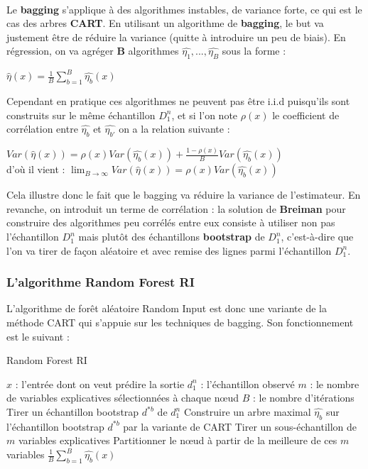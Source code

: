\documentclass[14pt, openany]{article}
\begin{document}
\paragraph{}
Le \textbf{bagging} s'applique à des algorithmes instables, de variance forte, ce qui est le cas des arbres \textbf{CART}. En utilisant un algorithme de \textbf{bagging}, le but va justement être de réduire la variance (quitte à introduire un peu de biais).
En régression, on va agréger \textbf{B} algorithmes $\hat{\eta_1},...,\hat{\eta_B}$ sous la forme :
\begin{center}
$\hat{\eta}(x)=\frac{1}{B}\sum\limits_{b=1}^B \hat{\eta_b}(x)$
\end{center}
Cependant en pratique ces algorithmes ne peuvent pas être i.i.d puisqu'ils sont construits sur le même échantillon $D^{n}_{1}$, et si l'on note $\rho(x)$ le coefficient de corrélation entre $\hat{\eta_b}$ et $\hat{\eta_{b'}}$ on a la relation suivante :
\begin{center}
$Var(\hat{\eta}(x))=\rho(x)Var(\hat{\eta_b}(x))+\frac{1-\rho(x)}{B}Var(\hat{\eta_b}(x))$\\
\medskip
d'où il vient : $\lim_{B \to \infty} Var(\hat{\eta}(x)) = \rho(x)Var(\hat{\eta_b}(x))$
\end{center}
Cela illustre donc le fait que le bagging va réduire la variance de l'estimateur. En revanche, on introduit un terme de corrélation : la solution de \textbf{Breiman} pour construire des algorithmes peu corrélés entre eux consiste à utiliser non pas l'échantillon $D^{n}_{1}$ mais plutôt des échantillons \textbf{bootstrap} de $D^{n}_{1}$, c'est-à-dire que l'on va tirer de façon aléatoire et avec remise des lignes parmi l'échantillon $D^{n}_{1}$.
\subsubsection{L'algorithme Random Forest RI}
L'algorithme de forêt aléatoire Random Input est donc une variante de la méthode CART qui s'appuie sur les techniques de bagging. Son fonctionnement est le suivant :\\
\begin{algorithm}
\caption{Random Forest RI}
\begin{algorithmic}
\REQUIRE 
\STATE $x$ : l'entrée dont on veut prédire la sortie
\STATE $d^{n}_{1}$ : l'échantillon observé
\STATE $m$ : le nombre de variables explicatives sélectionnées à chaque nœud
\STATE $B$ : le nombre d'itérations
\ENSURE
{}
\STATE Tirer un échantillon bootstrap $d^{*b}$ de $d^{n}_{1}$
\STATE Construire un arbre maximal $\hat{\eta_b}$ sur l'échantillon bootstrap $d^{*b}$ par la variante de CART
\STATE Tirer un sous-échantillon de $m$ variables explicatives
\STATE Partitionner le nœud à partir de la \og meilleure \fg{} de ces $m$ variables
\ENDFOR
\ENDFOR
\RETURN $\frac{1}{B}\sum\limits_{b=1}^B \hat{\eta_b}(x)$
\PRINT
\end{algorithmic}
\end{algorithm}
\end{document}
